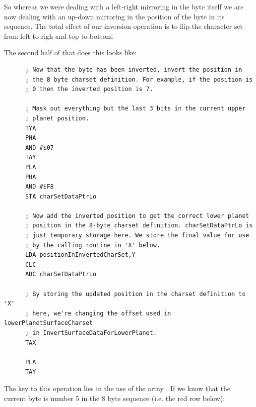 So whereas we were dealing with a left-right mirroring in the byte itself we are now dealing with an up-down
mirroring in the position of the byte in its sequence. The total effect of our inversion operation is
to flip the character set from left to righ and top to bottom:

\begin{figure}[H]
{
  \setlength{\tabcolsep}{3.0pt}
  \setlength\cmidrulewidth{\heavyrulewidth} %
    \begin{adjustbox}{width=10cm,center}
  \begin{subfigure}{0.3\textwidth}
  
  \end{subfigure}
  \begin{subfigure}{0.3\textwidth}
  
  \end{subfigure}
  \end{adjustbox}
}\caption[]{}
\end{figure}

The second half of  that does this looks like:

\begin{lstlisting}
      ; Now that the byte has been inverted, invert the position in
      ; the 8 byte charset definition. For example, if the position is
      ; 0 then the inverted position is 7.

      ; Mask out everything but the last 3 bits in the current upper
      ; planet position. 
      TYA
      PHA
      AND #$07
      TAY
      PLA
      PHA
      AND #$F8
      STA charSetDataPtrLo

      ; Now add the inverted position to get the correct lower planet
      ; position in the 8-byte charset definition. charSetDataPtrLo is
      ; just temporary storage here. We store the final value for use
      ; by the calling routine in 'X' below.
      LDA positionInInvertedCharSet,Y
      CLC
      ADC charSetDataPtrLo

      ; By storing the updated position in the charset definition to 'X'
      ; here, we're changing the offset used in lowerPlanetSurfaceCharset
      ; in InvertSurfaceDataForLowerPlanet.
      TAX

      PLA
      TAY
\end{lstlisting}

The key to this operation lies in the use of the array .
If we know that the current byte is number 5 in the 8 byte sequence (i.e. the red row
below):

